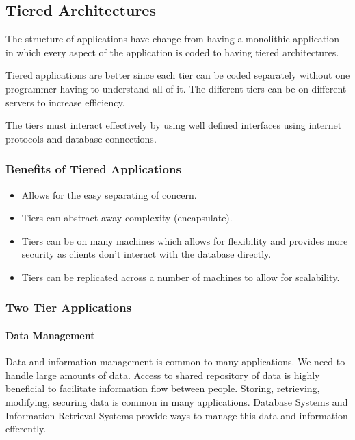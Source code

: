 \subsection{Tiered Architectures}\label{sub:tiered_architecutures}

The structure of applications have change from having a monolithic application in which every aspect of the application is coded to having tiered architectures.

Tiered applications are better since each tier can be coded separately without one programmer having to understand all of it.
The different tiers can be on different servers to increase efficiency.

The tiers must interact effectively by using well defined interfaces using internet protocols and database connections.

\subsubsection{Benefits of Tiered Applications}\label{ssub:benefits_of_tiered_applications}

\begin{itemize}
	\item Allows for the easy separating of concern.
	\item Tiers can abstract away complexity (encapsulate).
	\item Tiers can be on many machines which allows for flexibility and provides more security as clients don't interact with the database directly.
	\item Tiers can be replicated across a number of machines to allow for scalability.
\end{itemize}

\subsubsection{Two Tier Applications}\label{ssub:two_tier_applications}

\paragraph{Data Management}\label{par:data_management}

Data and information management is common to many applications. We need to handle large amounts of data.
Access to shared repository of data is highly beneficial to facilitate information flow between people.
Storing, retrieving, modifying, securing data is common in many applications.
Database Systems and Information Retrieval Systems provide ways to manage this data and information efferently.


